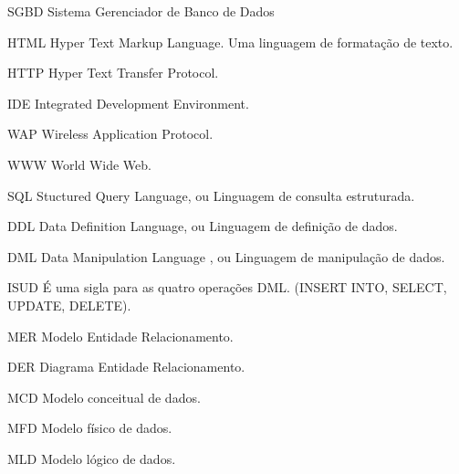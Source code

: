 \begin{siglas}
	\item[SGBD] Sistema Gerenciador de Banco de Dados
	\item[HTML] Hyper Text Markup Language. Uma linguagem de formatação de texto.
	\item[HTTP] Hyper Text Transfer Protocol.
	\item[IDE]	Integrated Development Environment.
	\item[WAP]	Wireless Application Protocol.
	\item[WWW]	World Wide Web.
	\item[SQL]	Stuctured Query Language, ou Linguagem de consulta estruturada.
	\item[DDL]	Data Definition Language, ou Linguagem de definição de dados.
	\item[DML]	Data Manipulation Language , ou Linguagem de manipulação de dados.
	\item[ISUD]	É uma sigla para as quatro operações DML. (INSERT INTO, SELECT, UPDATE, DELETE).
	\item[MER]	Modelo Entidade Relacionamento. 
	\item[DER]	Diagrama Entidade Relacionamento.
	\item[MCD]	Modelo conceitual de dados. 
	\item[MFD]	Modelo físico de dados. 
	\item[MLD]	Modelo lógico de dados. 

	
\end{siglas}